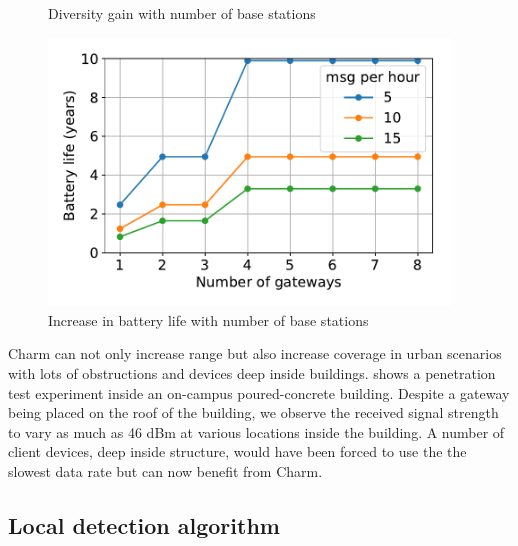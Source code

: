 \begin{figure}
\begin{minipage}{.32\textwidth}
\hspace*{-0.1in}
\caption{Diversity gain with number of base stations}
\label{fig:diversity-gain}
\compactimg
\end{minipage}
\hfill
\begin{minipage}{.32\textwidth}
\centering
\includegraphics[width=0.95\textwidth]{figures/diversity_battery}
\hspace*{-0.1in}
\caption{Increase in battery life with number of base stations}
\label{fig:diversity-battery}
\compactimg
\end{minipage}
\end{figure}




Charm can not only increase range but also increase coverage in urban scenarios with lots of obstructions and devices deep inside buildings.  shows a penetration test experiment inside an on-campus poured-concrete building. Despite a gateway being placed on the roof of the building, we observe the received signal strength to vary as much as 46 dBm at various locations inside the building. A number of client devices, deep inside structure, would have been forced to use the the slowest data rate but can now benefit from Charm.

\subsection{Local detection algorithm}
\label{sec:local-detection-eval}


